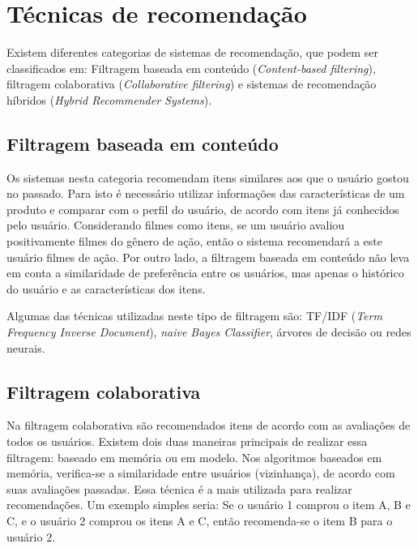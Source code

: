 \documentclass[12pt,a4paper,header]{abnt}
\begin{document}
\section{Técnicas de recomendação}

Existem diferentes categorias de sistemas de recomendação, que podem ser classificados em: Filtragem baseada em conteúdo (\textit{Content-based filtering}), filtragem colaborativa (\textit{Collaborative filtering}) e sistemas de recomendação híbridos (\textit{Hybrid Recommender Systems})\cite{melville2011recommender}.

\subsection{Filtragem baseada em conteúdo}

Os sistemas nesta categoria recomendam itens similares aos que o usuário gostou no passado\cite{gorakala2015building}. Para isto é necessário utilizar informações das características de um produto\cite{shapira2011recommender} e comparar com o perfil do usuário, de acordo com itens já conhecidos pelo usuário. Considerando filmes como itens, se um usuário avaliou positivamente filmes do gênero de ação, então o sistema recomendará a este usuário filmes de ação. Por outro lado, a filtragem baseada em conteúdo não leva em conta a similaridade de preferência entre os usuários, mas apenas o histórico do usuário e as características dos itens\cite{gorakala2015building}.

Algumas das técnicas utilizadas neste tipo de filtragem são: TF/IDF (\textit{Term Frequency Inverse Document}), \textit{naive Bayes Classifier}, árvores de decisão ou redes neurais\cite{isinkaye2015recommendation}. 

\subsection{Filtragem colaborativa}

Na filtragem colaborativa são recomendados itens de acordo com as avaliações de todos os usuários\cite{melville2011recommender}. Existem dois duas maneiras principais de realizar essa filtragem: baseado em memória ou em modelo\cite{dakhel2011new}. Nos algoritmos baseados em memória, verifica-se a similaridade entre usuários (vizinhança), de acordo com suas avaliações passadas. Essa técnica é a mais utilizada para realizar recomendações\cite{shapira2011recommender}. Um exemplo simples seria: Se o usuário 1 comprou o item A, B e C, e o usuário 2 comprou os itens A e C, então recomenda-se o item B para o usuário 2.
\end{document}
